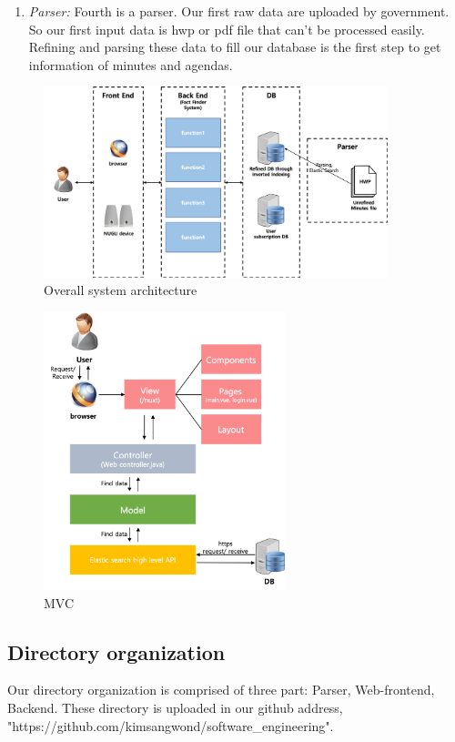 \documentclass[conference]{IEEEtran}
\begin{document}
\begin{enumerate}
\item \textit{Parser:} Fourth is a parser. Our first raw data are uploaded by government. So our first input data is hwp or pdf file that can’t  be processed easily. Refining and parsing these data to fill our database is the first  step to get information of minutes and agendas.\\
\end{enumerate}



\begin{figure}[htbp]
\centerline{\includegraphics[width=100mm,scale=0.5]{fig/6_1.png}}
\caption{Overall system architecture}
\label{fig}
\end{figure}

\begin{figure}[htbp]
\centerline{\includegraphics[width=70mm,scale=0.8]{fig/6_2.png}}
\caption{MVC}
\label{fig}
\end{figure}

\subsection{Directory organization}
Our directory organization is comprised of three part: Parser, Web-frontend, Backend. These directory is uploaded in our github address, "https://github.com/kimsangwond/software\_engineering".
\end{document}
